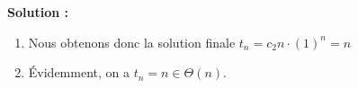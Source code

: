 \documentclass[11pt]{article} %
\newenvironment{solution}[1][\unskip]{%
	\par
	\noindent
	\textbf{Solution #1:}
	\noindent}
{\medskip}
\begin{document}
\begin{solution}
\begin{enumerate}
\begin{equation*}
\begin{array}{cccc|c}
		1 & 0 & 0 & 1 & 0\\
		1 & 1 & 1 & -1 & 1\\
		1 & 2 & 4 & 1 & 2\\
		1 & 3 & 9 & -1 & 3\\
		\end{array}\right] \sim \left[\begin{array}{cccc|c}
		1 & 0 & 0 & 0 & 0\\
		0 & 1 & 0 & 0 & 1\\
		0 & 0 & 1 & 0 & 0\\
		0 & 0 & 0 & 1 & 0\\
		\end{array}\right]
		\end{equation*}
		Nous avons donc $c_1=c_3=c_4 = 0$ et $c_2 = 1$.
		\item 	Nous obtenons donc la solution finale $t_n= c_2n\cdot (1)^n = n$
		\item Évidemment, on a $t_n = n \in \Theta(n)$.
	\end{enumerate}
\end{solution}
	
\end{document}
